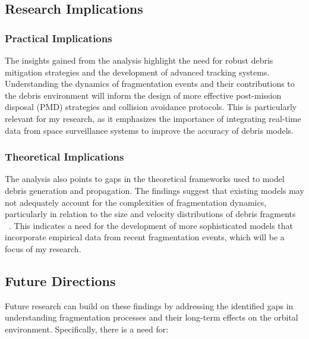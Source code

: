 \documentclass[journal ]{new-aiaa}
\begin{document}
\subsection{Research Implications}
\subsubsection{Practical Implications}
The insights gained from the analysis highlight the need for robust debris mitigation strategies and the development of advanced tracking systems. Understanding the dynamics of fragmentation events and their contributions to the debris environment will inform the design of more effective post-mission disposal (PMD) strategies and collision avoidance protocols. This is particularly relevant for my research, as it emphasizes the importance of integrating real-time data from space surveillance systems to improve the accuracy of debris models.

\subsubsection{Theoretical Implications}
The analysis also points to gaps in the theoretical frameworks used to model debris generation and propagation. The findings suggest that existing models may not adequately account for the complexities of fragmentation dynamics, particularly in relation to the size and velocity distributions of debris fragments ~\cite{mains_impact_2022}. This indicates a need for the development of more sophisticated models that incorporate empirical data from recent fragmentation events, which will be a focus of my research.

\subsection{Future Directions}
Future research can build on these findings by addressing the identified gaps in understanding fragmentation processes and their long-term effects on the orbital environment. Specifically, there is a need for:
\end{document}
